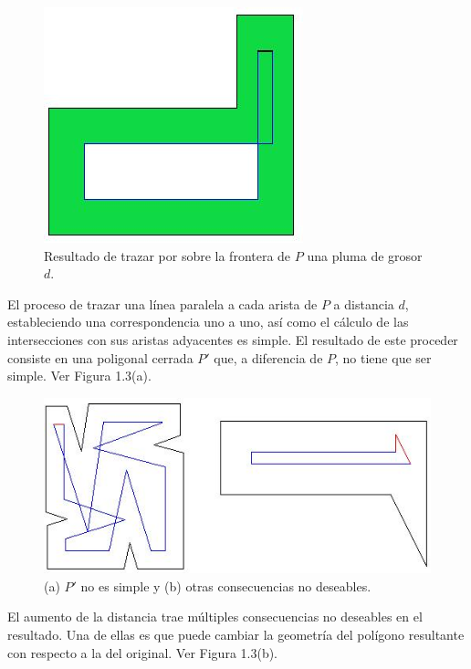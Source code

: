 \documentclass[12pt,english]{report}
\begin{document}
\begin{figure}[h]
\begin{center}
\includegraphics{plumad.jpg}%
\end{center}
\caption{Resultado de trazar por sobre la frontera de $P$ una pluma de grosor $d$.}
\end{figure}

El proceso de trazar una l\'inea paralela a cada arista de $P$ a distancia $d$, estableciendo una correspondencia uno a uno, as\'i como el c\'alculo de las intersecciones con sus aristas adyacentes es simple. El resultado de este proceder consiste en una poligonal cerrada $P'$ que, a diferencia de $P$, no tiene que ser simple. Ver Figura 1.3(a).

\begin{figure}[htbp]
\begin{center}
\includegraphics{tonyzad.jpg}%
\end{center}
\caption{(a) $P'$ no es simple y (b) otras consecuencias no deseables.}
\end{figure}

El aumento de la distancia trae m\'ultiples consecuencias no deseables en el resultado. Una de ellas es que puede cambiar la geometr\'ia del pol\'igono resultante con respecto a la del original. Ver Figura 1.3(b). 
\end{document}
